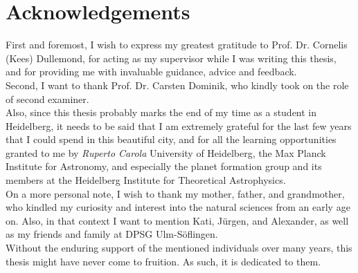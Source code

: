 \cleardoublepage
\chapter*{Acknowledgements}

\thispagestyle{NoHeader}

First and foremost, I wish to express my greatest gratitude to Prof. Dr. Cornelis (Kees) Dullemond,
for acting as my supervisor while I was writing this thesis, and for providing me with invaluable 
guidance, advice and feedback. \\

Second, I want to thank Prof. Dr. Carsten Dominik, who kindly took on the role of second 
examiner. \\

Also, since this thesis probably marks the end of my time as a student in Heidelberg, it needs to 
be said that I am extremely grateful for the last few years that I could spend in this beautiful 
city, and for all the learning opportunities granted to me by \textit{Ruperto Carola} University of 
Heidelberg, the Max Planck Institute for Astronomy, and especially the planet formation group and 
its members at the Heidelberg Institute for Theoretical Astrophysics. \\

On a more personal note, I wish to thank my mother, father, and grandmother, who kindled my 
curiosity and interest into the natural sciences from an early age on. Also, in that context I 
want to mention Kati, Jürgen, and Alexander, as well as my friends and family at DPSG
Ulm-Söflingen. \\

Without the enduring support of the mentioned individuals over many years, this thesis might have 
never come to fruition. As such, it is dedicated to them.








